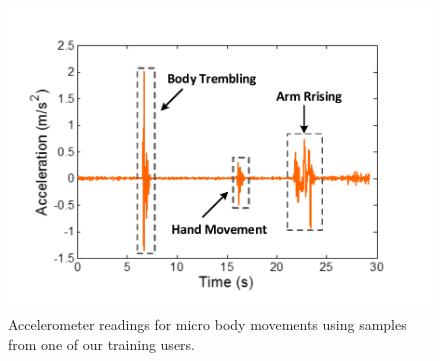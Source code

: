 %
%
%

\begin{figure}[!t]
\centering
      \includegraphics[width=0.43\linewidth]{Figures/Micromovement.pdf}
  \caption{Accelerometer readings for micro body movements using samples from one of our training users.}\label{fig:micro-move}
\end{figure}



